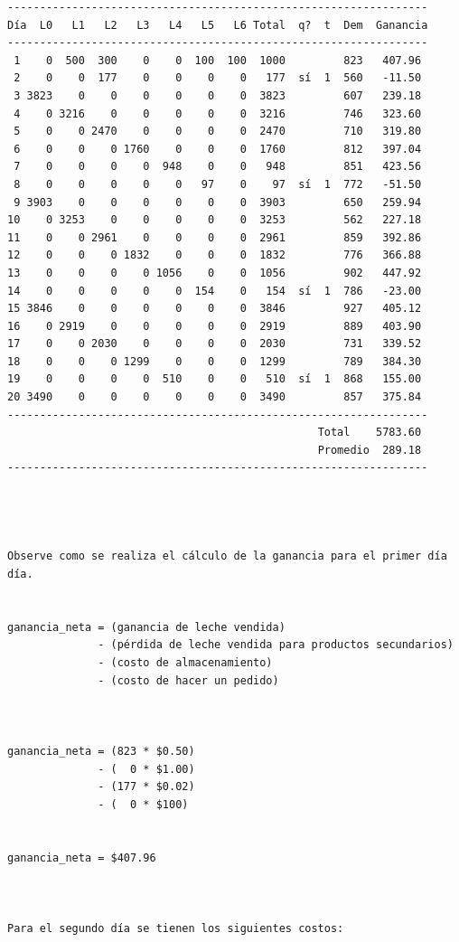 \begin{verbatim}
-----------------------------------------------------------------
Día  L0   L1   L2   L3   L4   L5   L6 Total  q?  t  Dem  Ganancia
-----------------------------------------------------------------
 1    0  500  300    0    0  100  100  1000         823   407.96
 2    0    0  177    0    0    0    0   177  sí  1  560   -11.50
 3 3823    0    0    0    0    0    0  3823         607   239.18
 4    0 3216    0    0    0    0    0  3216         746   323.60
 5    0    0 2470    0    0    0    0  2470         710   319.80
 6    0    0    0 1760    0    0    0  1760         812   397.04
 7    0    0    0    0  948    0    0   948         851   423.56
 8    0    0    0    0    0   97    0    97  sí  1  772   -51.50
 9 3903    0    0    0    0    0    0  3903         650   259.94
10    0 3253    0    0    0    0    0  3253         562   227.18
11    0    0 2961    0    0    0    0  2961         859   392.86
12    0    0    0 1832    0    0    0  1832         776   366.88
13    0    0    0    0 1056    0    0  1056         902   447.92
14    0    0    0    0    0  154    0   154  sí  1  786   -23.00
15 3846    0    0    0    0    0    0  3846         927   405.12
16    0 2919    0    0    0    0    0  2919         889   403.90
17    0    0 2030    0    0    0    0  2030         731   339.52
18    0    0    0 1299    0    0    0  1299         789   384.30
19    0    0    0    0  510    0    0   510  sí  1  868   155.00
20 3490    0    0    0    0    0    0  3490         857   375.84
-----------------------------------------------------------------
                                                Total    5783.60
                                                Promedio  289.18
-----------------------------------------------------------------




Observe como se realiza el cálculo de la ganancia para el primer día día.


ganancia_neta = (ganancia de leche vendida)
              - (pérdida de leche vendida para productos secundarios)
              - (costo de almacenamiento)
              - (costo de hacer un pedido)



ganancia_neta = (823 * $0.50)
              - (  0 * $1.00)
              - (177 * $0.02)
              - (  0 * $100)


ganancia_neta = $407.96



Para el segundo día se tienen los siguientes costos:



\end{verbatim}
